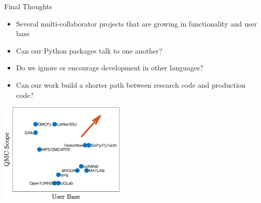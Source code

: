 \documentclass[11pt,compress,xcolor={usenames,dvipsnames},aspectratio=169]{beamer}
\begin{document}
\begin{frame}{Final Thoughts}
	
\begin{multicols}{2}
	\begin{itemize}
		\item Several multi-collaborator projects that are growing in functionality and user base
		
		\item Can our Python packages talk to one another?
		
		\item Do we ignore or encourage development in other languages?
		
		\item Can our work build a shorter path between research code and production code?
				
	\end{itemize}
	
	\columnbreak
	\includegraphics[width = 0.45\textwidth]{QMCSoftwarePlot.eps}	
\end{multicols}
	
\end{frame}




\thankyouframe

\printbibliography
\end{document}
